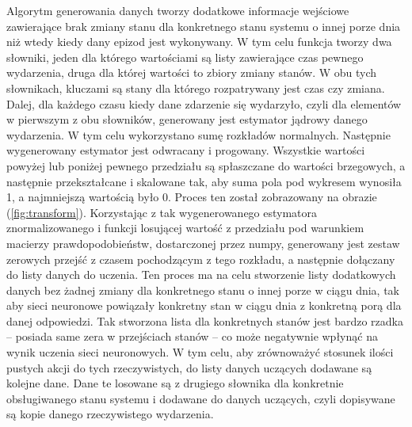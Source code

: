 Algorytm generowania danych tworzy dodatkowe informacje wejściowe zawierające brak zmiany stanu dla konkretnego stanu systemu o innej porze dnia niż wtedy kiedy dany epizod jest wykonywany. W tym celu funkcja tworzy dwa słowniki, jeden dla którego wartościami są listy zawierające czas pewnego wydarzenia, druga dla której wartości to zbiory zmiany stanów. W obu tych słownikach, kluczami są stany dla którego rozpatrywany jest czas czy zmiana. Dalej, dla każdego czasu kiedy dane zdarzenie się wydarzyło, czyli dla elementów w pierwszym z obu słowników, generowany jest estymator jądrowy danego wydarzenia. W tym celu wykorzystano sumę rozkładów normalnych. Następnie wygenerowany estymator jest odwracany i progowany. Wszystkie wartości powyżej lub poniżej pewnego przedziału są spłaszczane do wartości brzegowych, a następnie przekształcane i skalowane tak, aby suma pola pod wykresem wynosiła 1, a najmniejszą wartością było 0. Proces ten został zobrazowany na obrazie (\ref{fig:transform}). Korzystając z tak wygenerowanego estymatora znormalizowanego i funkcji losującej wartość z przedziału pod warunkiem macierzy prawdopodobieństw, dostarczonej przez numpy, generowany jest zestaw zerowych przejść z czasem pochodzącym z tego rozkładu, a następnie dołączany do listy danych do uczenia. Ten proces ma na celu stworzenie listy dodatkowych danych bez żadnej zmiany dla konkretnego stanu o innej porze w ciągu dnia, tak aby sieci neuronowe powiązały konkretny stan w ciągu dnia z konkretną porą dla danej odpowiedzi. Tak stworzona lista dla konkretnych stanów jest bardzo rzadka -- posiada same zera w przejściach stanów -- co może negatywnie wpłynąć na wynik uczenia sieci neuronowych. W tym celu, aby zrównoważyć stosunek ilości pustych akcji do tych rzeczywistych, do listy danych uczących dodawane są kolejne dane. Dane te losowane są z drugiego słownika dla konkretnie obsługiwanego stanu systemu i dodawane do danych uczących, czyli dopisywane są kopie danego rzeczywistego wydarzenia.

